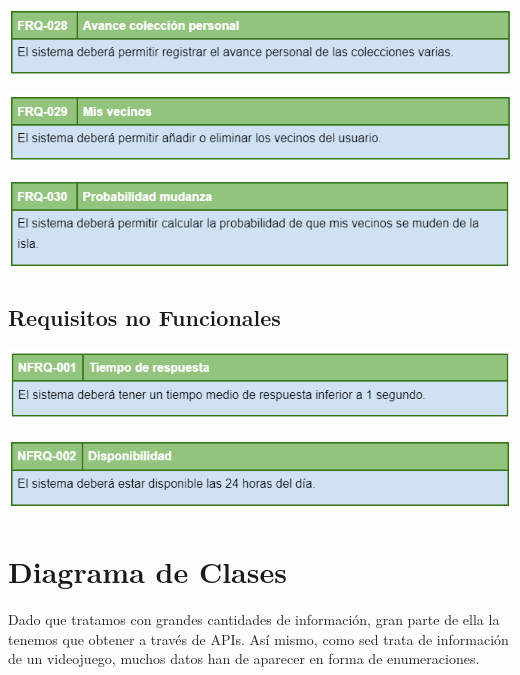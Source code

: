 	\bigskip
	
	\includegraphics[width=\textwidth]{img/cap5/FR/28.png}
	
	\bigskip
	
	\includegraphics[width=\textwidth]{img/cap5/FR/29.png}
	
	\bigskip
	
	\includegraphics[width=\textwidth]{img/cap5/FR/30.png}

	\subsection{Requisitos no Funcionales}
	
	\bigskip
	
	\includegraphics[width=\textwidth]{img/cap5/NFR/1.png}
	
	\bigskip
	
	\includegraphics[width=\textwidth]{img/cap5/NFR/2.png}
	
\section{Diagrama de Clases}

	\bigskip

	Dado que tratamos con grandes cantidades de información, gran parte de ella la tenemos que obtener a través de APIs. Así mismo, como sed trata de información de un videojuego, muchos datos han de aparecer en forma de enumeraciones.
	
